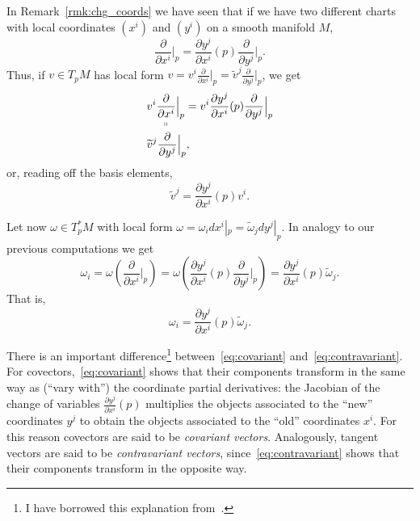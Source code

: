 In Remark~\ref{rmk:chg_coords} we have seen that if we have two different charts with local coordinates $(x^i)$ and $(y^i)$ on a smooth manifold $M$,
\begin{equation}
  \frac{\partial}{\partial x^i}\Big|_p = \frac{\partial y^j}{\partial x^i}(p) \frac{\partial}{\partial y^j}\Big|_p.
\end{equation}
Thus, if $v\in T_pM$ has local form $v = v^i \frac{\partial}{\partial x^i}\big|_p = \widetilde v^j \frac{\partial}{\partial y^j}\big|_p$, we get
\begin{align}
   & \underset{\shortparallel}{v^i \frac{\partial}{\partial x^i}\Big|_p} = v^i \frac{\partial y^j}{\partial x^i}(p) \frac{\partial}{\partial y^j}\Big|_p \\
   & \widetilde v^j \frac{\partial}{\partial y^j}\Big|_p,
\end{align}
or, reading off the basis elements,
\begin{equation}\label{eq:contravariant}
  \widetilde v^j = \frac{\partial y^j}{\partial x^i}(p) v^i.
\end{equation}

Let now $\omega\in T_p^*M$ with local form $\omega = \omega_i dx^i|_p = \widetilde \omega_j dy^j|_p$.
In analogy to our previous computations we get
\begin{equation}
  \omega_i
  = \omega\left(\frac{\partial}{\partial x^i}\Big|_p\right)
  = \omega\left(\frac{\partial y^j}{\partial x^i}(p) \frac{\partial}{\partial y^j}\Big|_p\right)
  = \frac{\partial y^j}{\partial x^i}(p) \widetilde\omega_j.
\end{equation}
That is,
\begin{equation}\label{eq:covariant}
  \omega_i = \frac{\partial y^j}{\partial x^i}(p) \widetilde\omega_j.
\end{equation}

There is an important difference\footnote{I have borrowed this explanation from~\cite[Chapter 11]{book:lee}.} between~\eqref{eq:covariant} and~\eqref{eq:contravariant}.
For covectors,~\eqref{eq:covariant} shows that their components transform in the same way as (``vary with'') the coordinate partial derivatives: the Jacobian of the change of variables $\frac{\partial y^j}{\partial x^i}(p)$ multiplies the objects associated to the ``new'' coordinates $y^j$ to obtain the objects associated to the ``old'' coordinates $x^i$.
For this reason covectors are said to be \emph{covariant vectors}.
Analogously, tangent vectors are said to be \emph{contravariant vectors}, since~\eqref{eq:contravariant} shows that their components transform in the opposite way.

